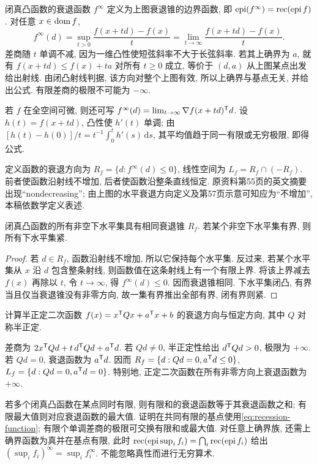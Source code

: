 闭真凸函数的衰退函数 $f^\infty$ 定义为上图衰退锥的边界函数, 即 $\operatorname{epi}(f^\infty)=\operatorname{rec}(\operatorname{epi} f)$. 对任意 $x\in\operatorname{dom} f$,
\begin{equation}\label{eq:recession-function}
f^\infty(d)=\sup_{t>0}\frac{f(x+td)-f(x)}t
=\lim_{t\to\infty}\frac{f(x+td)-f(x)}t.
\end{equation}
差商随 $t$ 单调不减, 因为一维凸性使短弦斜率不大于长弦斜率. 若其上确界为 $a$, 就有 $f(x+td)\le f(x)+ta$ 对所有 $t\ge0$ 成立, 等价于 $(d,a)$ 从上图某点出发给出射线. 由闭凸射线判据, 该方向对整个上图有效, 所以上确界与基点无关, 并给出公式. 有限差商的极限不可能为 $-\infty$.

若 $f$ 在全空间可微, 则还可写 $f^\infty(d)=\lim_{t\to\infty}\nabla f(x+td)^{\mathsf T} d$. 设 $h(t)=f(x+td)$, 凸性使 $h'(t)$ 单调; 由 $[h(t)-h(0)]/t=t^{-1}\int_0^t h'(s)\,\mathrm ds$, 其平均值趋于同一有限或无穷极限, 即得公式.

定义函数的衰退方向为 $R_f=\{d:f^\infty(d)\le0\}$, 线性空间为 $L_f=R_f\cap(-R_f)$. 前者使函数沿射线不增加, 后者使函数沿整条直线恒定. 原资料第55页的英文摘要出现“nondecreasing”; 由上图的水平衰退方向定义及第57页示意可知应为“不增加”, 本稿依数学定义表述.

\begin{proposition}\label{prop:levelrecession}
闭真凸函数的所有非空下水平集具有相同衰退锥 $R_f$. 若某个非空下水平集有界, 则所有下水平集紧.
\end{proposition}
\begin{proof}
若 $d\in R_f$, 函数沿射线不增加, 所以它保持每个水平集. 反过来, 若某个水平集从 $x$ 沿 $d$ 包含整条射线, 则函数值在这条射线上有一个有限上界. 将该上界减去 $f(x)$ 再除以 $t$, 令 $t\to\infty$, 得 $f^\infty(d)\le0$. 因而衰退锥相同. 下水平集闭凸, 有界当且仅当衰退锥没有非零方向, 故一集有界推出全部有界, 闭有界则紧.
\end{proof}
\begin{example}
计算半正定二次函数 $f(x)=x^{\mathsf T} Qx+a^{\mathsf T} x+b$ 的衰退方向与恒定方向, 其中 $Q$ 对称半正定.
\end{example}
\begin{solution}
差商为 $2x^{\mathsf T} Qd+t\,d^{\mathsf T} Qd+a^{\mathsf T} d$. 若 $Qd\ne0$, 半正定性给出 $d^{\mathsf T} Qd>0$, 极限为 $+\infty$. 若 $Qd=0$, 衰退函数为 $a^{\mathsf T} d$. 因而 $R_f=\{d:Qd=0,a^{\mathsf T} d\le0\}$, $L_f=\{d:Qd=0,a^{\mathsf T} d=0\}$. 特别地, 正定二次函数在所有非零方向上衰退函数为 $+\infty$.
\end{solution}
若多个闭真凸函数在某点同时有限, 则有限和的衰退函数等于其衰退函数之和; 有限最大值则对应衰退函数的最大值. 证明在共同有限的基点使用\eqref{eq:recession-function}; 有限个单调差商的极限可交换有限和或最大值. 对任意上确界族, 还需上确界函数为真并在基点有限, 此时 $\operatorname{rec}(\operatorname{epi}\sup_if_i)=\bigcap_i\operatorname{rec}(\operatorname{epi} f_i)$ 给出 $ (\sup_if_i)^\infty=\sup_i f_i^\infty$. 不能忽略真性而进行无穷算术.

